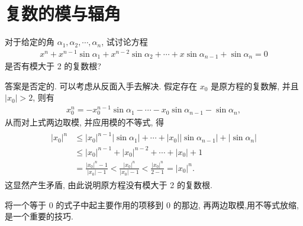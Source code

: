 \section{复数的模与辐角}
\begin{example}
	对于给定的角 $\alpha_1, \alpha_2, \cdots, \alpha_n$, 试讨论方程
	\begin{align*}
		x^n+x^{n-1} \sin \alpha_1+x^{n-2} \sin \alpha_2+\cdots+x \sin \alpha_{n-1}+\sin \alpha_n=0
	\end{align*}
	是否有模大于 2 的复数根?
\end{example}
\begin{solution}
	答案是否定的. 可以考虑从反面入手去解决.
	假定存在 $x_0$ 是原方程的复数解, 并且 $\left|x_0\right|>2$, 则有
	\begin{align*}
		x_0^n=-x_0^{n-1} \sin \alpha_1-\cdots-x_0 \sin \alpha_{n-1}-\sin \alpha_n,
	\end{align*}
	从而对上式两边取模, 并应用模的不等式, 得
	\begin{align*}
		\begin{aligned}
			\left|x_0\right|^n & \leqslant\left|x_0\right|^{n-1}\left|\sin \alpha_1\right|+\cdots+\left|x_0\right|\left|\sin \alpha_{n-1}\right|+\left|\sin \alpha_n\right|         \\
			                   & \leqslant\left|x_0\right|^{n-1}+\left|x_0\right|^{n-2}+\cdots+\left|x_0\right|+1                                                                   \\
			                   & =\frac{\left|x_0\right|^n-1}{\left|x_0\right|-1}<\frac{\left|x_0\right|^n}{\left|x_0\right|-1}<\frac{\left|x_0\right|^n}{2-1}=\left|x_0\right|^n .
		\end{aligned}
	\end{align*}
	这显然产生矛盾, 由此说明原方程没有模大于 2 的复数根.
\end{solution}
\begin{note}
	将一个等于 0 的式子中起主要作用的项移到 0 的那边, 再两边取模,用不等式放缩, 是一个重要的技巧.
\end{note}

